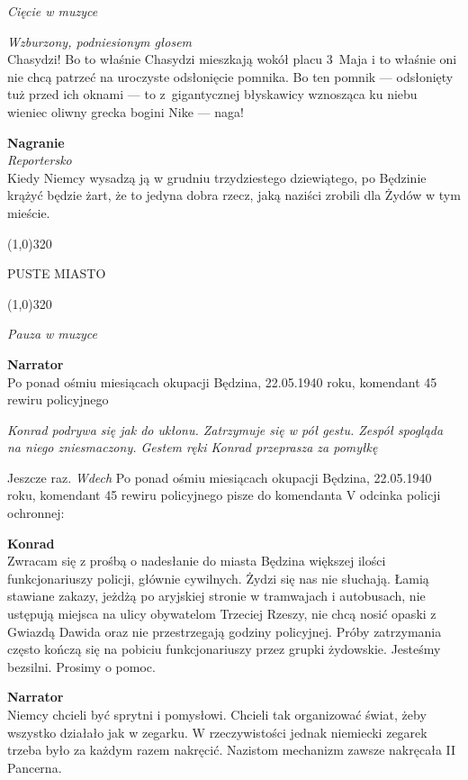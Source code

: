\documentclass[11pt,a4paper,oneside]{article}
\begin{document}
{\color{light-gray} \emph{Cięcie w muzyce}}

{\color{light-gray} \emph{Wzburzony, podniesionym głosem}}\\
Chasydzi! Bo to właśnie Chasydzi mieszkają wokół placu 3~Maja i to
właśnie oni nie chcą patrzeć na uroczyste odsłonięcie pomnika. Bo ten
pomnik --- odsłonięty tuż przed ich oknami --- to z~gigantycznej błyskawicy
wznosząca ku niebu wieniec oliwny grecka bogini Nike --- naga!

\textbf{Nagranie}\\
{\color{light-gray} \emph{Reportersko}}\\
Kiedy Niemcy wysadzą ją w grudniu trzydziestego dziewiątego, po
Będzinie krążyć będzie żart, że to jedyna dobra rzecz, jaką naziści
zrobili dla Żydów w tym mieście.

\line(1,0){320}

{\color{red}
PUSTE MIASTO
}

\line(1,0){320}

{\color{light-gray} \emph{Pauza w muzyce}}

\textbf{Narrator}\\
Po ponad ośmiu miesiącach okupacji Będzina, 22.05.1940 roku, komendant
45 rewiru policyjnego

{\color{light-gray} \emph{Konrad podrywa się jak do ukłonu. Zatrzymuje
się w pół gestu. Zespół spogląda na niego zniesmaczony. Gestem ręki
Konrad przeprasza za pomyłkę}}

Jeszcze raz. {\color{light-gray} \emph{Wdech}} Po ponad ośmiu
miesiącach okupacji Będzina, 22.05.1940 roku, komendant 45 rewiru
policyjnego pisze do komendanta V odcinka policji ochronnej:

{\color{konrad}
\textbf{Konrad}\\
Zwracam się z prośbą o nadesłanie do miasta Będzina większej ilości
funkcjonariuszy policji, głównie cywilnych. Żydzi się nas nie
słuchają. Łamią stawiane zakazy, jeżdżą po aryjskiej stronie
w tramwajach i autobusach, nie ustępują miejsca na ulicy obywatelom
Trzeciej Rzeszy, nie chcą nosić opaski z Gwiazdą Dawida oraz nie
przestrzegają godziny policyjnej. Próby zatrzymania często kończą się
na pobiciu funkcjonariuszy przez grupki żydowskie. Jesteśmy bezsilni.
Prosimy o pomoc.
}

\textbf{Narrator}\\
Niemcy chcieli być sprytni i pomysłowi. Chcieli tak organizować świat,
żeby wszystko działało jak w zegarku. W rzeczywistości jednak
niemiecki zegarek trzeba było za każdym razem nakręcić. Nazistom
mechanizm zawsze nakręcała II Pancerna. 
\end{document}
